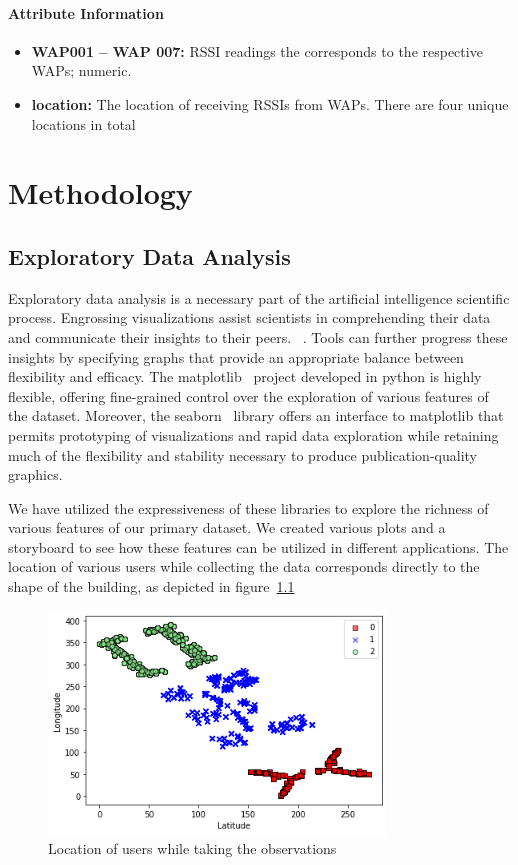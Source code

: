 \documentclass[a4paper,singleside,12pt]{report} %
\begin{document}
			\subsubsection{Attribute Information}
				\begin{itemize}
				\item  \textbf{WAP001 – WAP 007:}  RSSI readings the corresponds to the respective WAPs; numeric.
				\item  \textbf{location:} The location of receiving RSSIs from WAPs. There are four unique locations in total
				\end{itemize}



	\chapter{Methodology}
		\section{Exploratory Data Analysis}
			Exploratory data analysis is a necessary part of the artificial intelligence scientific process.
			Engrossing visualizations assist scientists in comprehending their data and communicate their insights to their peers. ~\cite{Exploratory-data-analysis}.
			Tools can further progress these insights by specifying graphs that provide an appropriate balance between flexibility and efficacy.
			The matplotlib~\cite{4160265} project developed in python is highly flexible, offering fine-grained control over the exploration of various features of the dataset.
			Moreover, the seaborn~\cite{waskom2021seaborn} library offers an interface to matplotlib that permits prototyping of visualizations and rapid data exploration while retaining much of the flexibility and stability necessary to produce publication-quality graphics.

			We have utilized the expressiveness of these libraries to explore the richness of various features of our primary dataset.
			We created various plots and a storyboard to see how these features can be utilized in different applications. 
			The location of various users while collecting the data corresponds directly to the shape of the building, as depicted in figure~\ref{fig4.1}
	
	
			\begin{figure}[!htb]
			\centerline{\includegraphics[width=0.8\textwidth]{./figures/building scatter plot.png}}
			\caption{Location of users while taking the observations}
			\label{fig4.1}
			\end{figure}
	
\end{document}
